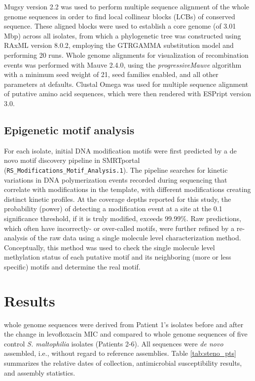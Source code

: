 Mugsy version 2.2 was used to perform multiple sequence alignment of the whole genome sequences in order to find local collinear blocks (LCBs) of conserved sequence.\autocite{Angiuoli2011} These aligned blocks were used to establish a core genome (of 3.01 Mbp) across all isolates, from which a phylogenetic tree was constructed using RAxML version 8.0.2,\autocite{Stamatakis2014} employing the GTRGAMMA substitution model and performing 20 runs. Whole genome alignments for visualization of recombination events was performed with Mauve 2.4.0,\autocite{Darling2004} using the \emph{progressiveMauve} algorithm\autocite{Darling2010} with a minimum seed weight of 21, seed families enabled, and all other parameters at defaults. Clustal Omega\autocite{Sievers2011} was used for multiple sequence alignment of putative amino acid sequences, which were then rendered with ESPript version 3.0.\autocite{Robert2014}

\subsection{Epigenetic motif analysis}

For each isolate, initial DNA modification motifs were first predicted by a de novo motif discovery pipeline in SMRTportal (\texttt{RS\_Modifications\_Motif\_Analysis.1}). The pipeline searches for kinetic variations in DNA polymerization events recorded during sequencing that correlate with modifications in the template, with different modifications creating distinct kinetic profiles.\autocite{Clark2012,Fang2012} At the coverage depths reported for this study, the probability (power) of detecting a modification event at a site at the 0.1 significance threshold, if it is truly modified, exceeds 99.99\%.\autocite{Fang2012} Raw predictions, which often have incorrectly- or over-called motifs, were further refined by a re-analysis of the raw data using a single molecule level characterization method.\autocite{Beaulaurier2015} Conceptually, this method was used to check the single molecule level methylation status of each putative motif and its neighboring (more or less specific) motifs and determine the real motif. 

\section{Results}

 whole genome sequences were derived from Patient 1’s isolates before and after the change in levofloxacin MIC and compared to whole genome sequences of five control \emph{S. maltophilia} isolates (Patients 2-6). All sequences were \emph{de novo} assembled, i.e., without regard to reference assemblies. Table \ref{tab:steno_pts} summarizes the relative dates of collection, antimicrobial susceptibility results, and assembly statistics.

